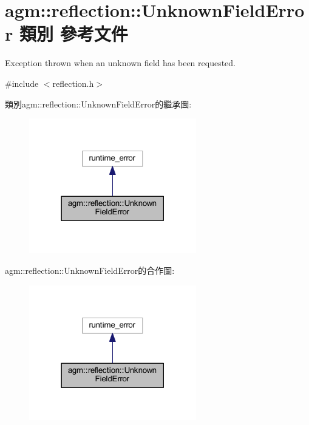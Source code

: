 \hypertarget{classagm_1_1reflection_1_1_unknown_field_error}{}\section{agm\+:\+:reflection\+:\+:Unknown\+Field\+Error 類別 參考文件}
\label{classagm_1_1reflection_1_1_unknown_field_error}


Exception thrown when an unknown field has been requested.  




{\ttfamily \#include $<$reflection.\+h$>$}



類別agm\+:\+:reflection\+:\+:Unknown\+Field\+Error的繼承圖\+:\nopagebreak
\begin{figure}[H]
\begin{center}
\leavevmode
\includegraphics[width=206pt]{classagm_1_1reflection_1_1_unknown_field_error__inherit__graph}
\end{center}
\end{figure}


agm\+:\+:reflection\+:\+:Unknown\+Field\+Error的合作圖\+:\nopagebreak
\begin{figure}[H]
\begin{center}
\leavevmode
\includegraphics[width=206pt]{classagm_1_1reflection_1_1_unknown_field_error__coll__graph}
\end{center}
\end{figure}
